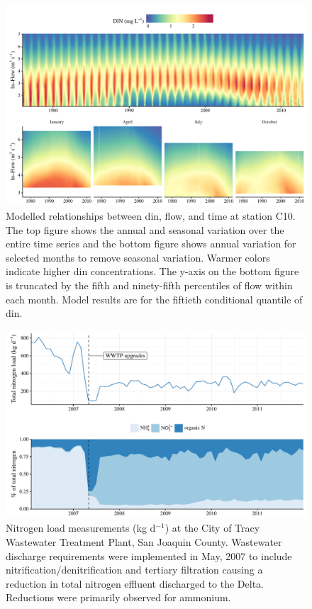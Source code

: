 \documentclass[letterpaper,12pt,oneside]{article}\usepackage[]{graphicx}\usepackage[]{color}
\begin{document}
\begin{figure}[!ht]

{\centering \includegraphics[width=\textwidth]{figs/dinc10dyna-1} 

}

\caption{Modelled relationships between \ac{din}, flow, and time at station C10.  The top figure shows the annual and seasonal variation over the entire time series and the bottom figure shows annual variation for selected months to remove seasonal variation.  Warmer colors indicate higher \ac{din} concentrations.  The y-axis on the bottom figure is truncated by the fifth and ninety-fifth percentiles of flow within each month.  Model results are for the fiftieth conditional quantile of \ac{din}.}\label{fig:dinc10dyna}
\end{figure}



\begin{figure}[!ht]

{\centering \includegraphics[width=\textwidth]{figs/tracy-1} 

}

\caption[Nitrogen load measurements (kg d]{Nitrogen load measurements (kg d$^{-1}$) at the City of Tracy Wastewater Treatment Plant, San Joaquin County.  Wastewater discharge requirements were implemented in May, 2007 to include nitrification/denitrification and tertiary filtration causing a reduction in total nitrogen effluent discharged to the Delta. Reductions were primarily observed for ammonium.}\label{fig:tracy}
\end{figure}
\end{document}
